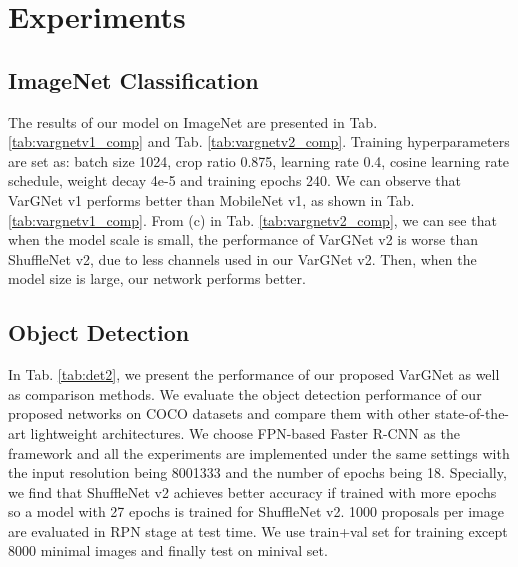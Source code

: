 \documentclass{article}
\begin{document}
\section{Experiments}
\subsection{ImageNet Classification}
The results of our model on ImageNet are presented in Tab. \ref{tab:vargnetv1_comp} and Tab. \ref{tab:vargnetv2_comp}.
Training hyperparameters are set as: batch size 1024, crop ratio 0.875, learning rate 0.4, cosine learning rate schedule, weight decay 4e-5 and training epochs 240. We can observe that VarGNet v1 performs better than MobileNet v1, as shown in Tab. \ref{tab:vargnetv1_comp}. From (c) in Tab. \ref{tab:vargnetv2_comp}, we can see that when the model scale is small, the performance of VarGNet v2 is worse than ShuffleNet v2, due to less channels used in our VarGNet v2. Then, when the model size is large, our network performs better.

\subsection{Object Detection}

In Tab. \ref{tab:det2}, we present the performance of our proposed VarGNet as well as comparison methods. 
We evaluate the object detection performance of our proposed networks on COCO datasets \cite{Lin2014MicrosoftCC} and compare them with other state-of-the-art lightweight architectures.  We choose FPN-based Faster R-CNN \cite{Lin2017FeaturePN} as the framework and all the experiments are implemented under the same settings with the input resolution being 8001333 and the number of epochs being 18. Specially, we find that ShuffleNet v2 achieves better accuracy if trained with more epochs so a model with 27 epochs is trained for ShuffleNet v2. 1000 proposals per image are evaluated in RPN stage at test time.  We use train+val set for training except 8000 minimal images and finally test on minival set. 
\end{document}
